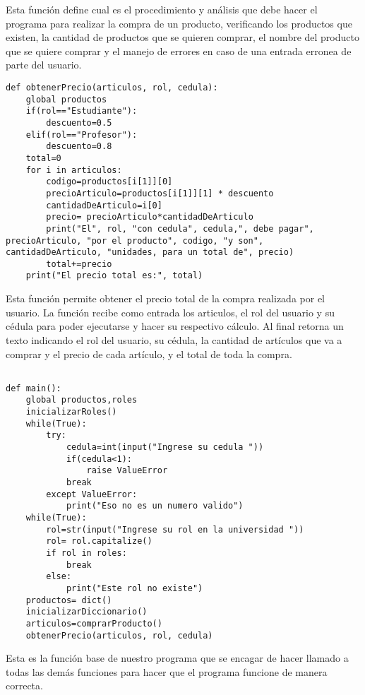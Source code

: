 \documentclass[a4paper,11pt]{article}
\theoremstyle{mytheor}
\begin{document}
Esta función define cual es el procedimiento y análisis que debe hacer el programa para realizar la compra de un producto, verificando los productos que existen, la cantidad de productos que se quieren comprar, el nombre del producto que se quiere comprar y el manejo de errores en caso de una entrada erronea de parte del usuario.

\begin{lstlisting}[label={list:fifth},caption=obtenerPrecio()]
def obtenerPrecio(articulos, rol, cedula):
    global productos
    if(rol=="Estudiante"):
        descuento=0.5
    elif(rol=="Profesor"):
        descuento=0.8
    total=0
    for i in articulos:
        codigo=productos[i[1]][0]
        precioArticulo=productos[i[1]][1] * descuento
        cantidadDeArticulo=i[0]
        precio= precioArticulo*cantidadDeArticulo
        print("El", rol, "con cedula", cedula,", debe pagar", precioArticulo, "por el producto", codigo, "y son", cantidadDeArticulo, "unidades, para un total de", precio)
        total+=precio
    print("El precio total es:", total)
\end{lstlisting}

Esta función permite obtener el precio total de la compra realizada por el usuario. La función recibe como entrada los articulos, el rol del usuario y su cédula para poder ejecutarse y hacer su respectivo cálculo. Al final retorna un texto indicando el rol del usuario, su cédula, la cantidad de artículos que va a comprar y el precio de cada artículo, y el total de toda la compra.

\begin{lstlisting}[label={list:sixth},caption=main()]

def main():
    global productos,roles
    inicializarRoles()
    while(True):
        try:
            cedula=int(input("Ingrese su cedula "))
            if(cedula<1):
                raise ValueError
            break
        except ValueError:
            print("Eso no es un numero valido")
    while(True):
        rol=str(input("Ingrese su rol en la universidad "))
        rol= rol.capitalize()
        if rol in roles:
            break
        else:
            print("Este rol no existe")
    productos= dict()
    inicializarDiccionario()
    articulos=comprarProducto()
    obtenerPrecio(articulos, rol, cedula)

\end{lstlisting}

Esta es la función base de nuestro programa que se encagar de hacer llamado a todas las demás funciones para hacer que el programa funcione de manera correcta.
\end{document}
